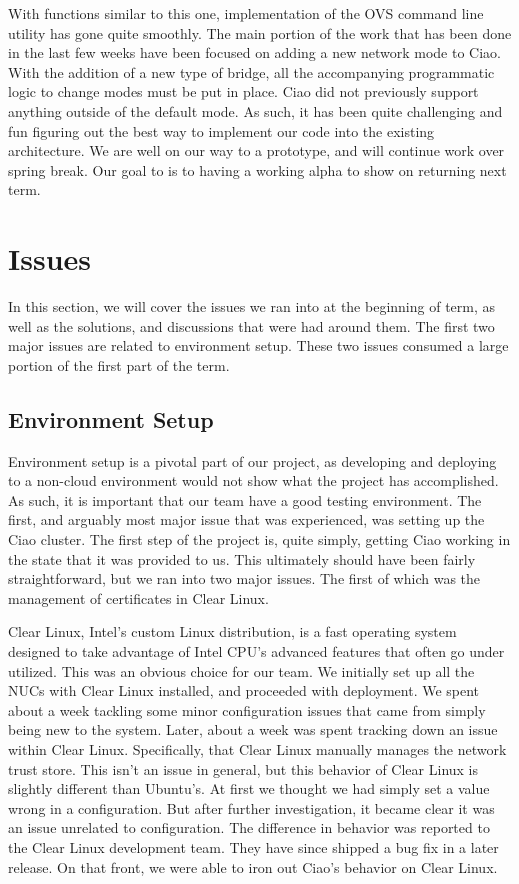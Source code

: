 \documentclass[10pt,onecolumn,journal,draftclsnofoot]{IEEEtran}
\begin{document}
With functions similar to this one, implementation of the OVS command line
utility has gone quite smoothly. The main portion of the work that has been done
in the last few weeks have been focused on adding a new network mode to Ciao.
With the addition of a new type of bridge, all the accompanying programmatic
logic to change modes must be put in place. Ciao did not previously support anything
outside of the default mode. As such, it has been quite challenging and fun
figuring out the best way to implement our code into the existing architecture.
We are well on our way to a prototype, and will continue work over spring break.
Our goal to is to having a working alpha to show on returning next term.

\section{Issues}
In this section, we will cover the issues we ran into at the beginning of term,
as well as the solutions, and discussions that were had around them. The first
two major issues are related to environment setup. These two issues consumed a
large portion of the first part of the term.

\subsection{Environment Setup}
Environment setup is a pivotal part of our project, as developing and deploying
to a non-cloud environment would not show what the project has accomplished.
As such, it is important that our team have a good testing
environment. The first, and arguably most major issue that was experienced,
was setting up the Ciao cluster. The first step of the project is, quite simply,
getting Ciao working in the state that it was provided to us. This ultimately
should have been fairly straightforward, but we ran into two major issues. 
The first of which was the management of certificates in Clear Linux.

Clear Linux, Intel's custom Linux distribution, is a fast operating system
designed to take advantage of Intel CPU's advanced features that often go
under utilized. This was an obvious choice for our team. We initially set up
all the NUCs with Clear Linux installed, and proceeded with deployment.
We spent about a week tackling some minor configuration issues that came from
simply being new to the system. Later, about a week was spent tracking down an
issue within Clear Linux. Specifically, that Clear Linux manually manages the
network trust store. This isn't an issue in general, but this behavior of Clear
Linux is slightly different than Ubuntu's. At first we thought we had simply
set a value wrong in a configuration. But after further investigation, it
became clear it was an issue unrelated to configuration. The difference in 
behavior was reported to the Clear Linux development team. They have since
shipped a bug fix in a later release. On that front, we were able to iron out
Ciao's behavior on Clear Linux.
\end{document}
